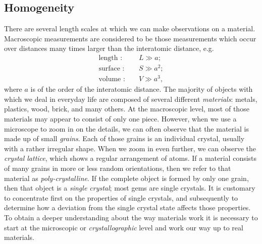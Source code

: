 \subsection{Homogeneity\label{ssec:homogeneity}}
There are several length scales at which we can make observations on a material.  Macroscopic measurements are considered to be those measurements which occur over distances many times larger than the interatomic distance, e.g.\
\begin{eqnarray}
	\mbox{length : }&&L \gg a; \nonumber\\
	\mbox{surface : }&&S \gg a^{2};\\
	\mbox{volume : }&&V \gg a^{3},\nonumber
\end{eqnarray}
where $a$ is of the order of the interatomic distance.  The majority of objects with which we deal in everyday life are composed of several different \textit{materials}: metals, plastics, wood, brick, and many others.  At the macroscopic level, most of those materials may appear to consist of only one piece.  However, when we use a microscope to zoom in on the details, we can often observe that the material is made up of small \textit{grains}.  Each of those grains is an individual crystal, usually with a rather irregular shape.  When we zoom in even further, we can observe the \textit{crystal lattice}, which shows a regular arrangement of atoms.  If a material consists of many grains in more or less random orientations, then we refer to that material as \textit{poly-crystalline}.  If the complete object is formed by only one grain, then that object is a \textit{single crystal}; most gems are single crystals.  It is customary to concentrate first on the properties of single crystals, and subsequently to determine how a deviation from the single crystal state affects those properties.  To obtain a deeper understanding about the way materials work it is necessary to start at the microscopic or \textit{crystallographic} level and work our way up to real materials.

